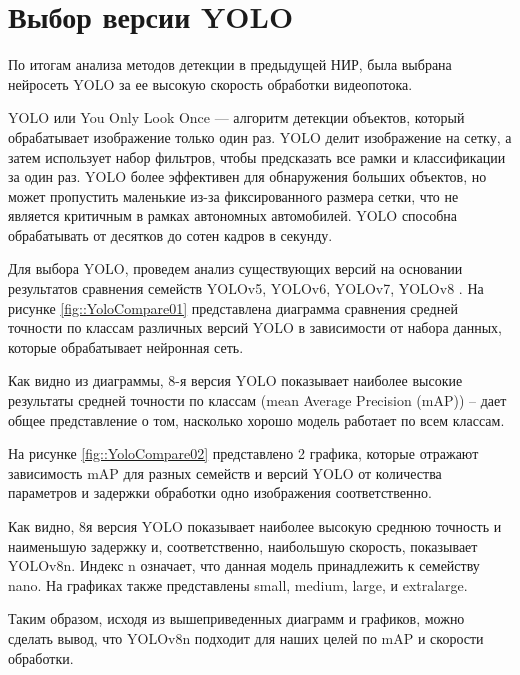 \chapter {Выбор версии YOLO}

По итогам анализа методов детекции в предыдущей НИР, была выбрана нейросеть YOLO
за ее высокую скорость обработки видеопотока. 

YOLO или You Only Look Once — алгоритм детекции объектов, который обрабатывает
изображение только один раз. YOLO делит изображение на сетку, а затем использует
набор фильтров, чтобы предсказать все рамки и классификации за один раз. YOLO 
более эффективен для обнаружения больших объектов, но может пропустить маленькие
из-за фиксированного размера сетки, что не является критичным в рамках автономных
автомобилей. YOLO способна обрабатывать от десятков до сотен кадров в секунду.

Для выбора YOLO, проведем анализ существующих версий на основании результатов
сравнения семейств YOLOv5, YOLOv6, YOLOv7, YOLOv8 \cite{site::YoloCompare,
article::Hussain2023}. На рисунке \ref{fig::YoloCompare01} представлена диаграмма
сравнения средней точности по классам различных версий YOLO в зависимости от 
набора данных, которые обрабатывает нейронная сеть. 


Как видно из диаграммы, 8-я версия YOLO показывает наиболее высокие результаты 
средней точности по классам (mean Average Precision (mAP)) -- дает общее 
представление о том, насколько хорошо модель работает по всем классам. 

На рисунке \ref{fig::YoloCompare02} представлено 2 графика, которые отражают 
зависимость mAP для разных семейств и версий YOLO от количества параметров и
задержки обработки одно изображения соответственно. 


Как видно, 8я версия YOLO показывает наиболее высокую среднюю точность и наименьшую
задержку и, соответственно, наибольшую скорость, показывает YOLOv8n. Индекс n
означает, что данная модель принадлежить к семейству nano. На графиках также 
представлены small, medium, large, и extralarge. 

Таким образом, исходя из вышеприведенных диаграмм и графиков, можно сделать вывод,
что YOLOv8n подходит для наших целей по mAP и скорости обработки. 
